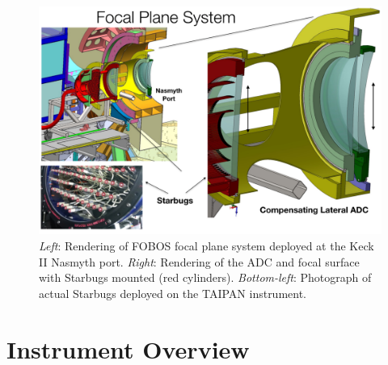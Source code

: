 
\begin{figure}[h!]
\includegraphics[width=\textwidth]{figs/FOBOS_FocalPlane.pdf}
\caption{\small {\it
Left}: Rendering of FOBOS focal plane system deployed at the Keck II
Nasmyth port. {\it Right}: Rendering of the ADC and focal surface with
Starbugs mounted (red cylinders). {\it Bottom-left}: Photograph of actual Starbugs
deployed on the TAIPAN instrument.}
\label{fig:focalplane}
\end{figure}

\section{Instrument Overview}
\label{sec:concept}


